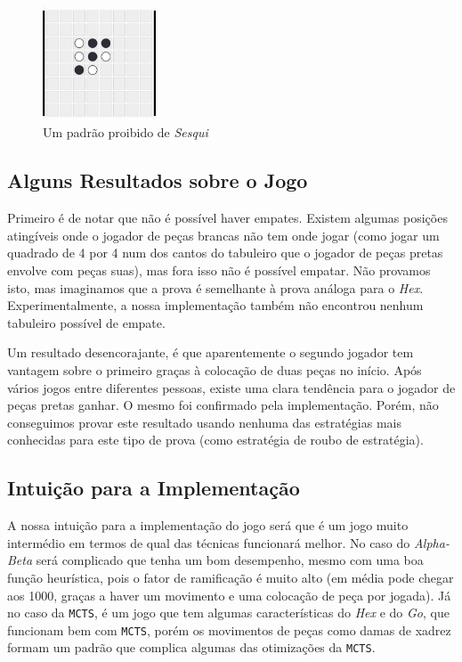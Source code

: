 \documentclass[12pt,a4paper,oneside]{article}
\begin{document}
\begin{figure}[!htb]
  \centering
  \includegraphics[width=0.3\textwidth]{sesqui_forb}
  \caption{Um padrão proibido de \textit{Sesqui}}
  \label{fig:cross}
\end{figure}

\subsection{Alguns Resultados sobre o Jogo}


Primeiro é de notar que não é possível haver empates. Existem algumas
posições atingíveis onde o jogador de peças brancas não tem onde jogar
(como jogar um quadrado de 4 por 4 num dos cantos do tabuleiro que o
jogador de peças pretas envolve com peças suas), mas fora isso não é
possível empatar. Não provamos isto, mas imaginamos que a prova é
semelhante à prova análoga para o \textit{Hex}. Experimentalmente, a
nossa implementação também não encontrou nenhum tabuleiro possível de
empate.

Um resultado desencorajante, é que aparentemente o segundo jogador tem
vantagem sobre o primeiro graças à colocação de duas peças no
início. Após vários jogos entre diferentes pessoas, existe uma clara
tendência para o jogador de peças pretas ganhar. O mesmo foi
confirmado pela implementação. Porém, não conseguimos provar este
resultado usando nenhuma das estratégias mais conhecidas para este
tipo de prova (como estratégia de roubo de estratégia).

\subsection{Intuição para a Implementação}

A nossa intuição para a implementação do jogo será que é um jogo muito
intermédio em termos de qual das técnicas funcionará melhor. No caso
do \textit{Alpha-Beta} será complicado que tenha um bom desempenho,
mesmo com uma boa função heurística, pois o fator de ramificação é
muito alto (em média pode chegar aos 1000, graças a haver um movimento
e uma colocação de peça por jogada). Já no caso da \texttt{MCTS}, é um
jogo que tem algumas características do \textit{Hex} e do \textit{Go},
que funcionam bem com \texttt{MCTS}, porém os movimentos de peças como
damas de xadrez formam um padrão que complica algumas das otimizações
da \texttt{MCTS}.
\end{document}
